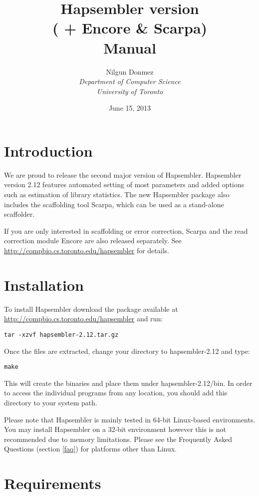 \documentclass[12pt,a4paper]{report}
\title{Hapsembler version \hapversion{} \\ ( + Encore \& Scarpa) \\ Manual }
\author{Nilgun Donmez \\
\emph{Department of Computer Science} \\
\emph{University of Toronto} }
\date{June 15, 2013}
\newcommand{\hapversion}{2.12}
\begin{document}
\maketitle
\tableofcontents
\newpage

\renewcommand*\thesection{\arabic{section}}

\section{Introduction}

We are proud to release the second major version of Hapsembler. Hapsembler version \hapversion{} features automated setting of most parameters and added options such as estimation of library statistics. The new Hapsembler package also includes the scaffolding tool Scarpa, which can be used as a stand-alone scaffolder. 

If you are only interested in scaffolding or error correction, Scarpa and the read correction module Encore are also released separately. See \url{http://compbio.cs.toronto.edu/hapsembler} for details. 

\section{Installation}

To install Hapsembler download the package available at \url{http://compbio.cs.toronto.edu/hapsembler} and run:

\begin{verbatim}
tar -xzvf hapsembler-2.12.tar.gz
\end{verbatim}

Once the files are extracted, change your directory to hapsembler-\hapversion{} and type:

\begin{verbatim}
make
\end{verbatim}

This will create the binaries and place them under hapsembler-\hapversion{}/bin. In order to access the individual programs from any location, you should add this directory to your system path. 

Please note that Hapsembler is mainly tested in 64-bit Linux-based environments. You may install Hapsembler on a 32-bit environment however this is not recommended due to memory limitations. Please see the Frequently Asked Questions (section \ref{faq}) for platforms other than Linux.

\section{Requirements}
\end{document}
